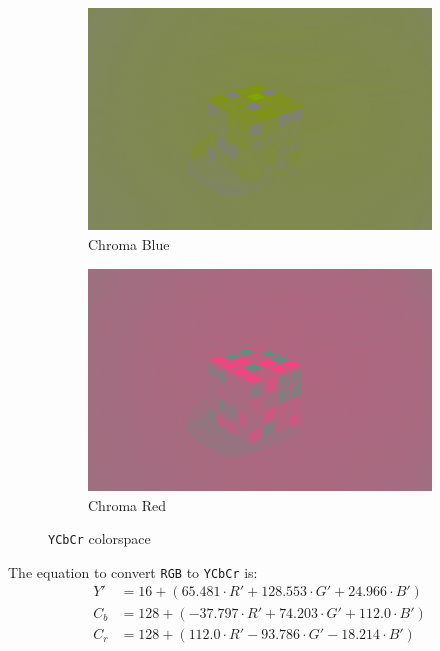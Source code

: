 \documentclass{article}
\begin{document}
\begin{figure}[h!]
\begin{subfigure}[b]{0.4\textwidth}
\begin{center}
	\includegraphics[width=\textwidth]{./implementation/experiment/Cb.png}
\end{center}
\caption{Chroma Blue}
\end{subfigure}%
\begin{subfigure}[b]{0.4\textwidth}
\begin{center}
	\includegraphics[width=\textwidth]{./implementation/experiment/Cr.png}
\end{center}
\caption{Chroma Red}
\end{subfigure}
\caption{\texttt{YCbCr} colorspace}
\label{fig:ycbcr}
\end{figure}

The equation to convert \texttt{RGB} to \texttt{YCbCr} is:
\begin{align}
	Y'  &= 16  + (65.481 \cdot R' + 128.553\cdot G' + 24.966 \cdot B') \\
	C_b &= 128 + (-37.797 \cdot R' + 74.203 \cdot G' + 112.0 \cdot B') \\
	C_r &= 128 + (112.0 \cdot R' - 93.786 \cdot G' - 18.214 \cdot B')
\end{align} 
\end{document}
